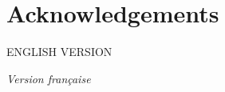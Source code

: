 \section*{Acknowledgements}
 ENGLISH VERSION

 \vspace{1.2em}

\noindent
\textit{Version française}

\vspace{0.5em}